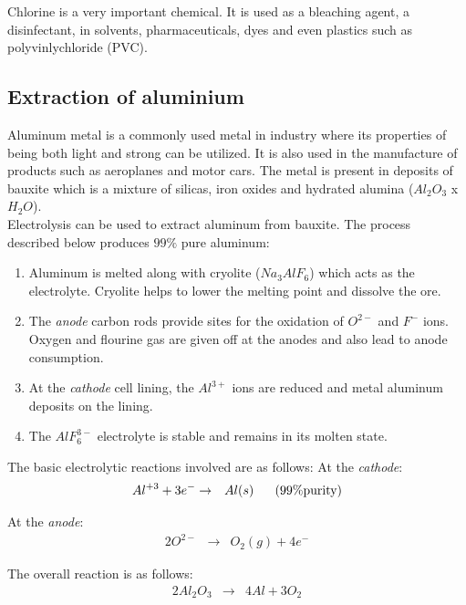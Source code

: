 Chlorine is a very important chemical. It is used as a bleaching agent, a disinfectant, in solvents, pharmaceuticals, dyes and even plastics such as polyvinlychloride (PVC).

\subsection{Extraction of aluminium}

Aluminum metal is a commonly used metal in industry where its properties of being both light and strong can be utilized. It is also used in the manufacture of products such as aeroplanes and motor cars. The metal is present in
deposits of bauxite which is a mixture of silicas, iron oxides and hydrated alumina ($Al_{2}O_{3}$ x $H_{2}O$). \\

Electrolysis can be used to extract aluminum from bauxite. The process described below produces $99\%$ pure aluminum:

\begin{enumerate}


  \item Aluminum is melted along with cryolite ($Na_{3}AlF_{6}$) which acts as the electrolyte. Cryolite helps to lower the melting point and dissolve the ore.
  \item  The \emph{anode} carbon rods provide sites for the oxidation of $O^{2-}$
  and $F^{-}$ ions. Oxygen and flourine gas are given off at the anodes and
  also lead to anode consumption.
  \item At the \emph{cathode} cell lining, the $Al^{3+}$ ions are reduced and metal
  aluminum deposits on the lining.
  \item The $AlF_{6}^{3-}$ electrolyte is stable and remains in its molten state.
\end{enumerate}

The basic electrolytic reactions involved are as follows:
At the \emph{cathode}:
\begin{eqnarray*}
  Al^{+3} + 3e^{-} &\rightarrow& Al(s) \rm{ \ \ \ \ \ } (99\% purity)
  \end{eqnarray*}

At the \emph{anode}:
\begin{eqnarray*}
  2O^{2-} &\rightarrow& O_{2}(g) + 4e^{-}
\end{eqnarray*}

The overall reaction is as follows:
\begin{eqnarray*}
  2Al_{2}O_{3} &\rightarrow& 4Al + 3O_{2}
\end{eqnarray*}

